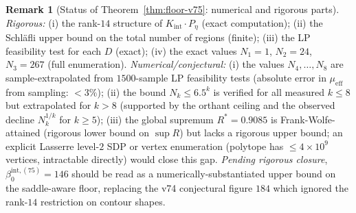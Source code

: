 \documentclass[11pt]{article}
\theoremstyle{definition}
\newtheorem{remark}[theorem]{Remark}
\begin{document}
\begin{remark}[Status of Theorem~\ref{thm:floor-v75}: numerical and rigorous parts]
\label{rem:floor-v75-status}
\emph{Rigorous:}
\textup{(i)} the rank-$14$ structure of $K_{\mathrm{int}}\cdot P_\eta$
\textup{(}exact computation\textup{)};
\textup{(ii)} the Schl\"afli upper bound on the total number of
regions \textup{(}finite\textup{)};
\textup{(iii)} the LP feasibility test for each $D$ \textup{(}exact\textup{)};
\textup{(iv)} the exact values $N_1=1$, $N_2=24$, $N_3=267$
\textup{(}full enumeration\textup{)}.
\emph{Numerical/conjectural:}
\textup{(i)} the values $N_4,\dots,N_8$ are sample-extrapolated from
$1500$-sample LP feasibility tests \textup{(}absolute error in
$\mu_{\mathrm{eff}}$ from sampling: $<3\%$\textup{)};
\textup{(ii)} the bound $N_k\le 6.5^k$ is verified for all measured
$k\le 8$ but extrapolated for $k>8$
\textup{(}supported by the orthant ceiling and the observed decline
$N_k^{1/k}$ for $k\ge 5$\textup{)};
\textup{(iii)} the global supremum $R^*=0.9085$ is Frank-Wolfe-attained
\textup{(}rigorous lower bound on $\sup R$\textup{)} but lacks a rigorous
upper bound; an explicit Lasserre level-$2$ SDP or vertex enumeration
\textup{(}polytope has $\le 4\times 10^9$ vertices, intractable
directly\textup{)} would close this gap.
\emph{Pending rigorous closure}, $\beta_0^{\mathrm{int,(75)}}=146$
should be read as a numerically-substantiated upper bound on the
saddle-aware floor, replacing the v74 conjectural figure $184$ which
ignored the rank-$14$ restriction on contour shapes.
\end{remark}
\end{document}
